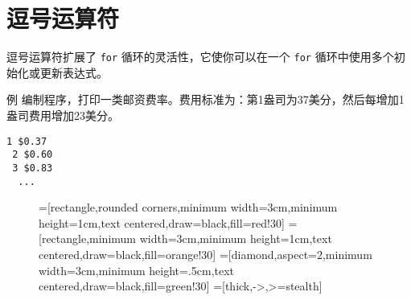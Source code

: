 \section{逗号运算符}
\begin{frame}[fragile]\ft{\secname}
逗号运算符扩展了 \lstinline|for| 循环的灵活性，它使你可以在一个 \lstinline|for| 循环中使用多个初始化或更新表达式。
\end{frame}

\begin{frame}[fragile]\ft{\secname}
\begin{block}{例}
编制程序，打印一类邮资费率。费用标准为：第1盎司为37美分，然后每增加1盎司费用增加23美分。
\end{block}
\end{frame}

\begin{frame}[fragile]\ft{\secname}
    
\end{frame}

\begin{frame}[fragile]\ft{\secname}
\begin{lstlisting}[backgroundcolor=\color{red!10}]
 1 $0.37
 2 $0.60
 3 $0.83
  ...
\end{lstlisting}
\end{frame}


\begin{frame}[fragile]\ft{\secname}
\begin{figure}
\centering
{}=[rectangle,rounded corners,minimum width=3cm,minimum height=1cm,text centered,draw=black,fill=red!30]
=[rectangle,minimum width=3cm,minimum height=1cm,text centered,draw=black,fill=orange!30]
=[diamond,aspect=2,minimum width=3cm,minimum height=.5cm,text centered,draw=black,fill=green!30]
=[thick,->,>=stealth]


\end{figure}

\end{frame}


